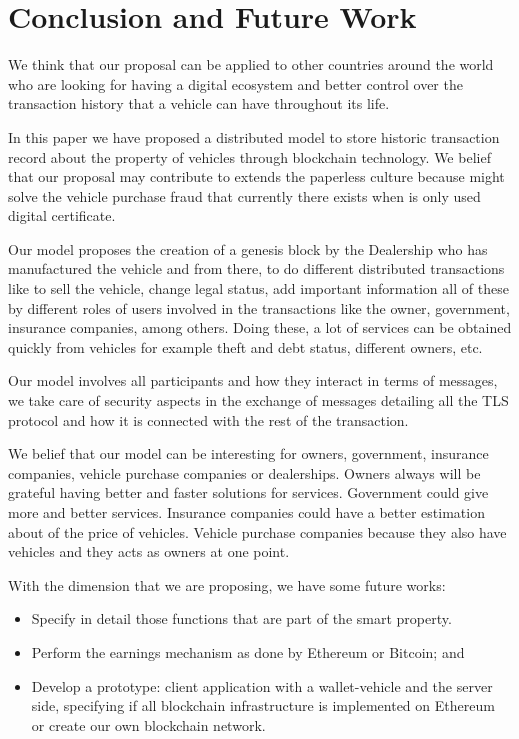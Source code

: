 
\section{Conclusion and Future Work}

We think that our proposal can be applied to other countries around the world who are looking for having a digital ecosystem and better
control over the transaction history that a vehicle can have throughout its life.


In this paper we have proposed a distributed model to store historic transaction record 
about the property of vehicles through blockchain technology. We belief that our proposal
may contribute to extends the paperless culture because might solve the vehicle purchase 
fraud that currently there exists when is only used digital certificate.

Our model proposes the creation of a genesis block by the Dealership who has manufactured 
the vehicle and from there, to do different distributed transactions like to sell the vehicle,
change legal status, add important information all of these by different roles of users involved
in the transactions like the owner, government, insurance companies, among others. Doing these, 
a lot of services can be obtained quickly from vehicles for example theft and debt status, different
owners, etc.

Our model involves all participants and how they interact in terms of messages, 
we take care of security aspects in the exchange of messages detailing all the TLS protocol and how it
is connected with the rest of the transaction.

We belief that our model can be interesting for owners, government, insurance companies, 
vehicle purchase companies or dealerships. Owners always will be grateful having better and 
faster solutions for services. Government could give more and better services. Insurance companies
could have a better estimation about of the price of vehicles. Vehicle purchase companies because
they also have vehicles and they acts as owners at one point.

With the dimension that we are proposing, we have some future works:
\begin{itemize}
    \item Specify in detail those functions that are part of the smart property.
    \item Perform the earnings mechanism as done by Ethereum or Bitcoin; and
    \item Develop a prototype: client application with a wallet-vehicle and the
        server side, specifying if all blockchain infrastructure is implemented on 
        Ethereum or create our own blockchain network.
\end{itemize} 






